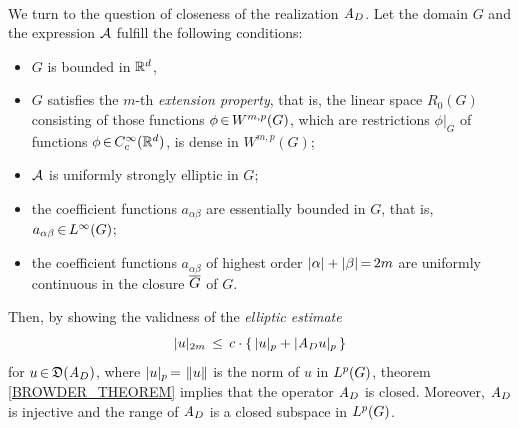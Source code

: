 \documentclass[11pt,twoside]{article}
\def\G{G}
\begin{document}
\paragraph{} %
We turn to the question of closeness of the realization $\mathit{A}_D$.
Let the domain $\G$ and the expression ${\mathcal{A}}$ fulfill the following conditions:

\begin{itemize}[leftmargin=9mm]
\item[(I)\;\;]
$\G$ is bounded in ${\mathbb{R}}^d$,

\item[(I')\;\,]
$\G$ satisfies the $m$-th \textit{extension property},
that is,
the linear space $R_0(\G)$ consisting
of those functions $\phi \xeof W^{m,p}(\G)$,
which are restrictions $\phi |_{\G}$
of functions $\phi {\,\in\,} C_c^{\infty}({\mathbb{R}}^d)$,
is dense in $W^{m,p}(\G)$;

\item[(II)\;]
${\mathcal{A}}$ is uniformly strongly elliptic in $\G$;

\item[(III)\,]
the coefficient functions $a_{\alpha \beta}$ are essentially bounded in $\G$,
that is,
$a_{\alpha \beta} \xeof L^{\infty}(\G)$;

\item[(III')]
the coefficient functions $a_{\alpha \beta}$ of highest order
$\abs{\alpha} + \abs{\beta} \eq 2m$ are uniformly continuous in the closure
$\clG$ of $\G$.
\end{itemize}

Then,
by showing the validness of the \textit{elliptic estimate}
\[
\abs{u} _{2m} \, \leq \, c \cdot \{ \,\abs{u} _p + \abs{\linA_D u} _p \, \}
\]
for $u {\,\in\,} \mathfrak{D}(\mathit{A}_D)$,
where $\abs{u} _p \eq \norm{u}$ is the norm of $u$ in $\Lp$,
theorem \ref{BROWDER_THEOREM} implies that the operator $\mathit{A}_D$ is closed.
Moreover,
$\mathit{A}_D$ is injective and the range of $\mathit{A}_D$ is a closed subspace in $\Lp$.

\end{document}
